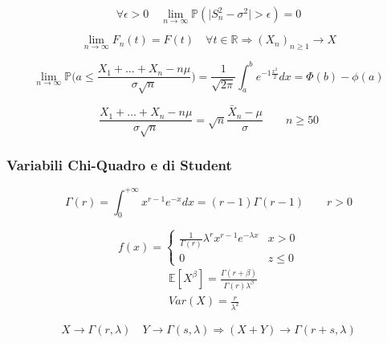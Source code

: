 \begin{proposition}
	\begin{equation}
		\forall \epsilon > 0 \quad \lim_{n \to \infty} \mathbb{P}(\lvert S_n^2 - \sigma^2 \rvert > \epsilon) = 0
	\end{equation}
\end{proposition}

\begin{definition}
	\begin{equation}
		\lim_{n \to \infty} F_n(t)=F(t) \quad \forall t \in \mathbb{R} \Longrightarrow (X_n)_{n \geq 1} \longrightarrow X 
	\end{equation}
\end{definition}

\begin{definition}
	\begin{equation}
		\lim_{n \to \infty}\mathbb{P}\bigg(a \leq \frac{X_1 + \ldots + X_n - n\mu}{\sigma \sqrt{n}}\bigg) = \frac{1}{\sqrt{2\pi}}\int_{a}^{b}e^{-1\frac{x^2}{2}}dx = \Phi(b)-\phi(a)
	\end{equation}
\end{definition}
\begin{definition}
	\begin{equation}
		\frac{X_1 + \ldots + X_n -n\mu}{\sigma \sqrt{n}} = \sqrt{n}\frac{\bar{X}_n-\mu}{\sigma} \quad\quad n\geq 50
	\end{equation}
\end{definition}

\subsubsection{Variabili Chi-Quadro e di Student}
\begin{definition}
	\begin{equation}
		\Gamma(r)=\int_{0}^{+\infty} x^{r-1}e^{-x}dx = (r-1)\Gamma(r-1) \quad\quad r>0
	\end{equation}
\end{definition}
\begin{definition}
	\begin{equation}
		f(x) = \begin{cases}
			\frac{1}{\Gamma(r)} \lambda^rx^{r-1}e^{-\lambda x} & x >0\\
			0& z \leq 0
		\end{cases}
	\end{equation}
	\begin{align}
		& \mathbb{E}[X^\beta] = \frac{\Gamma(r+\beta)}{\Gamma(r)\lambda^\beta} \\
		& Var(X)=\frac{r}{\lambda^2}
	\end{align}
\end{definition}
\begin{proposition}
	\begin{equation}
		X\to \Gamma(r, \lambda) \quad Y \to \Gamma(s, \lambda) \Longrightarrow (X+Y) \to \Gamma(r+s, \lambda)
	\end{equation}
\end{proposition}


